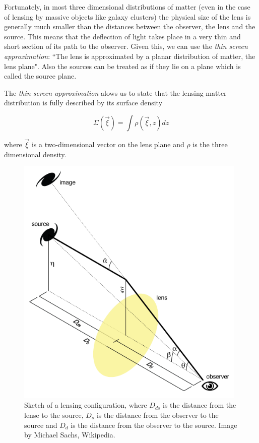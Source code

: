 Fortunately, in most three dimensional distributions of matter (even in the case of lensing by massive objects like galaxy clusters) the physical size of the lens is generally much smaller than the distances between the observer, the lens and the source. This means that the deflection of light takes place in a very thin and short section of its path to the observer. Given this, we can use the \textit{thin screen approximation}: ``The lens is approximated by a planar distribution of matter, the lens plane". Also the sources can be treated as if they lie on a plane which is called the source plane.

The \textit{thin screen approximation} alows us to state that the lensing matter distribution is fully described by its surface density

\begin{equation}
\Sigma(\vec{\xi}) = \int \rho (\vec{\xi},z)dz
\end{equation}

where $\vec{\xi}$ is a two-dimensional vector on the lens plane and $\rho$ is the three dimensional density.

\begin{figure}[H]
\centering
\includegraphics[width=11cm]{images/lensing.png}
\caption[Angles in gravitational lensing]{Sketch of a lensing configuration, where $D_{ds}$ is the distance from the lense to the source, $D_s$ is the distance from the observer to the source and $D_d$ is the distance from the observer to the source. Image by Michael Sachs, Wikipedia.}
\end{figure}


